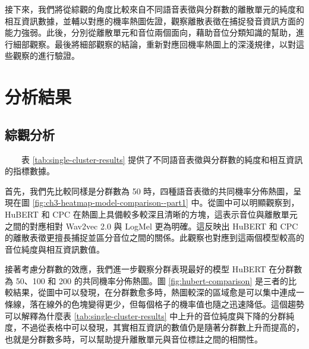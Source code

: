         接下來，我們將從綜觀的角度比較來自不同語音表徵與分群數的離散單元的純度和相互資訊數據，並輔以對應的機率熱圖佐證，觀察離散表徵在捕捉發音資訊方面的能力強弱。此後，分別從離散單元和音位兩個面向，藉助音位分類知識的幫助，進行細部觀察。最後將細部觀察的結論，重新對應回機率熱圖上的深淺規律，以對這些觀察的進行驗證。

\section{分析結果}

\subsection{綜觀分析}

　　表 \ref{tab:single-cluster-results} 提供了不同語音表徵與分群數的純度和相互資訊的指標數據。

        首先，我們先比較同樣是分群數為 50 時，四種語音表徵的共同機率分佈熱圖，呈現在圖 \ref{fig:ch3-heatmap-model-comparison--part1} 中。從圖中可以明顯觀察到，HuBERT 和 CPC 在熱圖上具備較多較深且清晰的方塊，這表示音位與離散單元之間的對應相對 Wav2vec 2.0 與 LogMel 更為明確。這反映出 HuBERT 和 CPC 的離散表徵更擅長捕捉並區分音位之間的關係。此觀察也對應到這兩個模型較高的音位純度與相互資訊數值。

        接著考慮分群數的效應，我們進一步觀察分群表現最好的模型 HuBERT 在分群數為 50、100 和 200 的共同機率分佈熱圖。圖 \ref{fig:hubert-comparison} 是三者的比較結果，從圖中可以發現，在分群數愈多時，熱圖較深的區域愈是可以集中連成一條線，落在線外的色塊變得更少，但每個格子的機率值也隨之迅速降低。這個趨勢可以解釋為什麼表 \ref{tab:single-cluster-results} 中上升的音位純度與下降的分群純度，不過從表格中可以發現，其實相互資訊的數值仍是隨著分群數上升而提高的，也就是分群數多時，可以幫助提升離散單元與音位標註之間的相關性。

